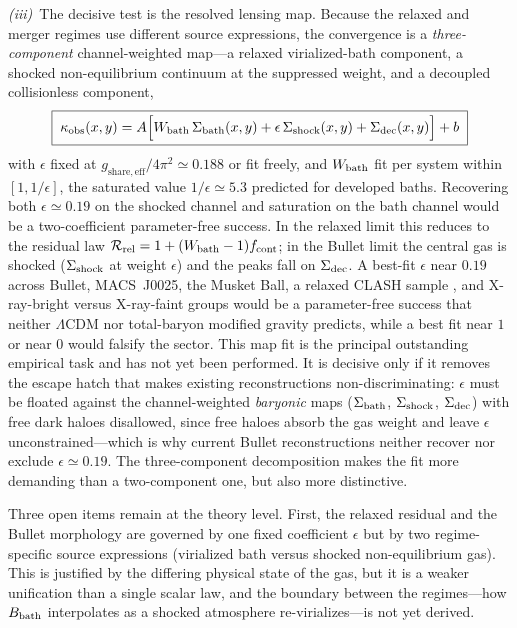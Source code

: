 \documentclass[11pt]{article}
\begin{document}
\emph{(iii)}~The decisive test is the resolved lensing map. Because the relaxed and merger regimes use different source expressions, the convergence is a \emph{three-component} channel-weighted map---a relaxed virialized-bath component, a shocked non-equilibrium continuum at the suppressed weight, and a decoupled collisionless component,
\[
\boxed{\;
\kappa_{\rm obs}(x,y)
=
A\Big[
W_{\rm bath}\,\Sigma_{\rm bath}(x,y)
+\epsilon\,\Sigma_{\rm shock}(x,y)
+\Sigma_{\rm dec}(x,y)
\Big]+b\;}
\]
with $\epsilon$ fixed at $g_{\mathrm{share,eff}}/4\pi^2\simeq0.188$ or fit freely, and $W_{\rm bath}$ fit per system within $[1,1/\epsilon]$, the saturated value $1/\epsilon\simeq5.3$ predicted for developed baths. Recovering both $\epsilon\simeq0.19$ on the shocked channel and saturation on the bath channel would be a two-coefficient parameter-free success. In the relaxed limit this reduces to the residual law $\mathcal R_{\rm rel}=1+(W_{\rm bath}-1)f_{\rm cont}$; in the Bullet limit the central gas is shocked ($\Sigma_{\rm shock}$ at weight $\epsilon$) and the peaks fall on $\Sigma_{\rm dec}$. A best-fit $\epsilon$ near $0.19$ across Bullet, MACS~J0025, the Musket Ball, a relaxed CLASH sample \citep{Tian2020}, and X-ray-bright versus X-ray-faint groups would be a parameter-free success that neither $\Lambda$CDM nor total-baryon modified gravity predicts, while a best fit near $1$ or near $0$ would falsify the sector. This map fit is the principal outstanding empirical task and has not yet been performed. It is decisive only if it removes the escape hatch that makes existing reconstructions non-discriminating: $\epsilon$ must be floated against the channel-weighted \emph{baryonic} maps ($\Sigma_{\rm bath}$, $\Sigma_{\rm shock}$, $\Sigma_{\rm dec}$) with free dark haloes disallowed, since free haloes absorb the gas weight and leave $\epsilon$ unconstrained---which is why current Bullet reconstructions neither recover nor exclude $\epsilon\simeq0.19$. The three-component decomposition makes the fit more demanding than a two-component one, but also more distinctive.

Three open items remain at the theory level. First, the relaxed residual and the Bullet morphology are governed by one fixed coefficient $\epsilon$ but by two regime-specific source expressions (virialized bath versus shocked non-equilibrium gas). This is justified by the differing physical state of the gas, but it is a weaker unification than a single scalar law, and the boundary between the regimes---how $B_{\rm bath}$ interpolates as a shocked atmosphere re-virializes---is not yet derived.
\end{document}
